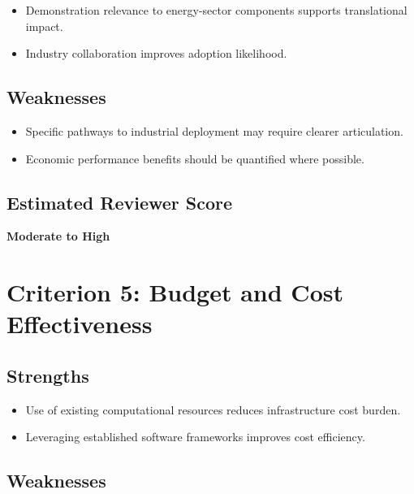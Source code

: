 \documentclass[11pt]{article}
\begin{document}
\begin{itemize}[leftmargin=1.5em]

\item Demonstration relevance to energy-sector components supports translational impact.

\item Industry collaboration improves adoption likelihood.

\end{itemize}

\subsection*{Weaknesses}

\begin{itemize}[leftmargin=1.5em]

\item Specific pathways to industrial deployment may require clearer articulation.

\item Economic performance benefits should be quantified where possible.

\end{itemize}

\subsection*{Estimated Reviewer Score}

\textbf{Moderate to High}

\section*{Criterion 5: Budget and Cost Effectiveness}

\subsection*{Strengths}

\begin{itemize}[leftmargin=1.5em]

\item Use of existing computational resources reduces infrastructure cost burden.

\item Leveraging established software frameworks improves cost efficiency.

\end{itemize}

\subsection*{Weaknesses}
\end{document}
